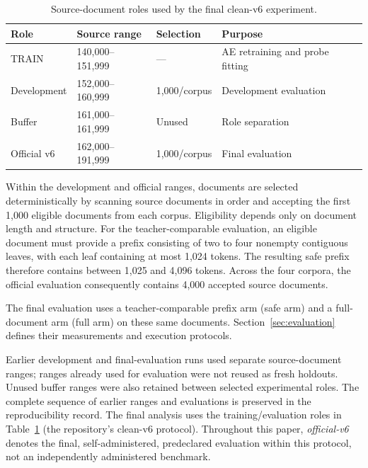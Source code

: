 \documentclass[10pt]{article}
\begin{document}
\begin{table}[t]
\caption{Source-document roles used by the final clean-v6 experiment.}
\label{tab:v6-splits}
\centering
\small
\begin{tabular}{llll}
\hline
\textbf{Role} & \textbf{Source range} & \textbf{Selection} & \textbf{Purpose} \\
\hline
TRAIN &
140,000--151,999 &
--- &
AE retraining and probe fitting \\

Development &
152,000--160,999 &
1,000/corpus &
Development evaluation \\

Buffer &
161,000--161,999 &
Unused &
Role separation \\

Official v6 &
162,000--191,999 &
1,000/corpus &
Final evaluation \\
\hline
\end{tabular}
\end{table}

Within the development and official ranges, documents are selected
deterministically by scanning source documents in order and accepting the first
1,000 eligible documents from each corpus. Eligibility depends only on document
length and structure. For the teacher-comparable evaluation, an eligible
document must provide a prefix consisting of two to four nonempty contiguous
leaves, with each leaf containing at most 1,024 tokens. The resulting safe
prefix therefore contains between 1,025 and 4,096 tokens. Across the four
corpora, the official evaluation consequently contains 4,000 accepted source
documents.

The final evaluation uses a teacher-comparable prefix arm (safe arm) and a
full-document arm (full arm) on these same documents.
Section~\ref{sec:evaluation} defines their measurements and execution protocols.

Earlier development and final-evaluation runs used separate source-document
ranges; ranges already used for evaluation were not reused as fresh holdouts.
Unused buffer ranges were also retained between selected experimental roles.
The complete sequence of earlier ranges and evaluations is preserved in the
reproducibility record. The final analysis uses the training/evaluation roles in
Table~\ref{tab:v6-splits} (the repository's clean-v6 protocol). Throughout this paper, \emph{official-v6}
denotes the final, self-administered, predeclared evaluation within this
protocol, not an independently administered benchmark.
\end{document}
